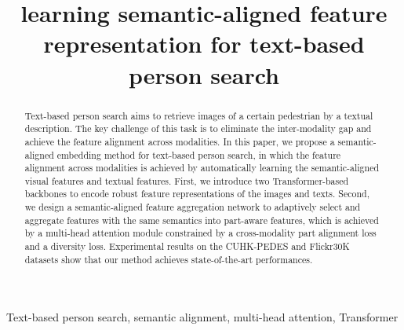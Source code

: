 \documentclass{article}
\title{learning semantic-aligned feature representation for text-based person search}
\begin{document}
\maketitle


\begin{abstract}
Text-based person search aims to retrieve images of a certain pedestrian by a textual description. The key challenge of this task is to eliminate the inter-modality gap and achieve the feature alignment across modalities. In this paper, we propose a semantic-aligned embedding method for text-based person search, in which the feature alignment across modalities is achieved by automatically learning the semantic-aligned visual features and textual features. First, we introduce two Transformer-based backbones to encode robust feature representations of the images and texts. Second, we design a semantic-aligned feature aggregation network to adaptively select and aggregate features with the same semantics into part-aware features, which is achieved by a multi-head attention module constrained by a cross-modality part alignment loss and a diversity loss. Experimental results on the CUHK-PEDES and Flickr30K datasets show that our method achieves state-of-the-art performances.
\end{abstract}
\begin{keywords}
Text-based person search, semantic alignment, multi-head attention, Transformer
\end{keywords}
\end{document}
